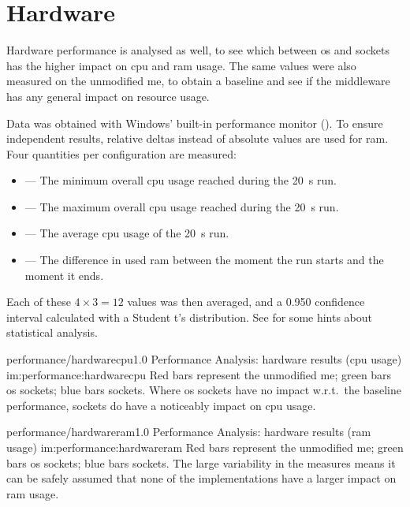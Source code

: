 \section{Hardware}\label{sc:performance:hardware}



Hardware performance is analysed as well, to see which between \gls{os} and  sockets has the higher impact on \gls{cpu} and \gls{ram} usage. The same values were also measured on the unmodified \gls{me}, to obtain a baseline and see if the \gls{middleware} has any general impact on resource usage.

Data was obtained with Windows' built-in performance monitor (). To ensure independent results, relative deltas instead of absolute values are used for \gls{ram}. Four quantities per configuration are measured:

\begin{itemize}
	\item {} --- The minimum overall \gls{cpu} usage reached during the \SI{20}{\second} run.
	\item {} --- The maximum overall \gls{cpu} usage reached during the \SI{20}{\second} run.
	\item {} --- The average \gls{cpu} usage of the \SI{20}{\second} run.
	\item {} --- The difference in used \gls{ram} between the moment the run starts and the moment it ends.
\end{itemize}

\FLOATnoindent Each of these $4\times3=12$ values was then averaged, and a \num{0,950} confidence interval calculated with a Student t's distribution. See  for some hints about statistical analysis.

\begin{image}
	{performance/hardwarecpu}{1.0}
	{Performance Analysis: hardware results (\gls{cpu} usage)}
	{im:performance:hardwarecpu}
	{}
	{Red bars represent the unmodified \gls{me}; green bars \gls{os} sockets; blue bars  sockets. Where \gls{os} sockets have no impact w.r.t.\ the baseline performance,  sockets do have a noticeably impact on \gls{cpu} usage.}
\end{image}

\begin{image}
	{performance/hardwareram}{1.0}
	{Performance Analysis: hardware results (\gls{ram} usage)}
	{im:performance:hardwareram}
	{}
	{Red bars represent the unmodified \gls{me}; green bars \gls{os} sockets; blue bars  sockets. The large variability in the measures means it can be safely assumed that none of the implementations have a larger impact on \gls{ram} usage.}
\end{image}


